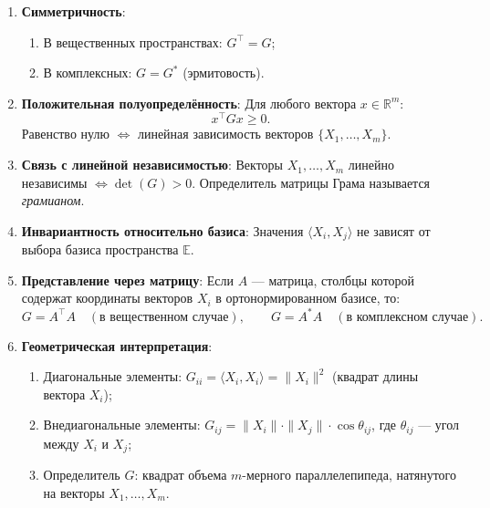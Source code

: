 \documentclass[12pt]{article}
\begin{document}
\begin{enumerate}
    \item \textbf{Симметричность}:
    \begin{enumerate}
        \item В вещественных пространствах: $G^\top = G$;
        \item В комплексных: $G = G^*$ (эрмитовость).
    \end{enumerate}
    \item \textbf{Положительная полуопределённость}:
        Для любого вектора $x \in \mathbb{R}^m$:  
        $$
        x^\top G x \geq 0.
        $$  
        Равенство нулю $\Leftrightarrow$ линейная зависимость векторов $\{X_1, \dots, X_m\}$.
    \item \textbf{Связь с линейной независимостью}:
        Векторы $X_1, \dots, X_m$ линейно независимы $\Leftrightarrow \det(G) > 0$.  
        Определитель матрицы Грама называется \textit{грамианом}.
    \item \textbf{Инвариантность относительно базиса}:
        Значения $\langle X_i, X_j \rangle$ не зависят от выбора базиса пространства $\mathbb{E}$.
    \item \textbf{Представление через матрицу}:
        Если $A$ — матрица, столбцы которой содержат координаты векторов $X_i$ в ортонормированном базисе, то:
        $$
        G = A^\top A \quad (\text{в вещественном случае}), \qquad G = A^* A \quad (\text{в комплексном случае}).
        $$
    \item \textbf{Геометрическая интерпретация}:
    \begin{enumerate}
        \item Диагональные элементы: $G_{ii} = \langle X_i, X_i \rangle = \|X_i\|^2$ (квадрат длины вектора $X_i$);
        \item Внедиагональные элементы: $G_{ij} = \|X_i\| \cdot \|X_j\| \cdot \cos \theta_{ij}$, где $\theta_{ij}$ — угол между $X_i$ и $X_j$;
        \item Определитель $G$: квадрат объема $m$-мерного параллелепипеда, натянутого на векторы $X_1, \dots, X_m$.
    \end{enumerate}
\end{enumerate}
        
\end{document}
